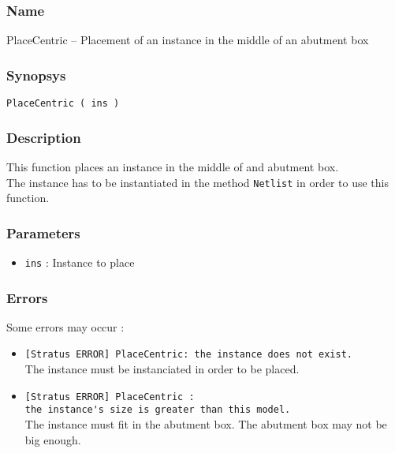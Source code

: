 \subsubsection{Name}

PlaceCentric -- Placement of an instance in the middle of an abutment box

\subsubsection{Synopsys}

\begin{verbatim}
PlaceCentric ( ins )
\end{verbatim}

\subsubsection{Description}

This function places an instance in the middle of and abutment box.\\
\indent The instance has to be instantiated in the method \verb-Netlist- in order to use this function.
    
\subsubsection{Parameters}

\begin{itemize}
    \item \verb-ins- : Instance to place
\end{itemize}

%
%
\subsubsection{Errors}
    
Some errors may occur :
\begin{itemize}
    \item \verb-[Stratus ERROR] PlaceCentric: the instance does not exist.-\\The instance must be instanciated in order to be placed.
    \item \verb-[Stratus ERROR] PlaceCentric :-\\\verb-the instance's size is greater than this model.-\\The instance must fit in the abutment box. The abutment box may not be big enough.
\end{itemize}
         
